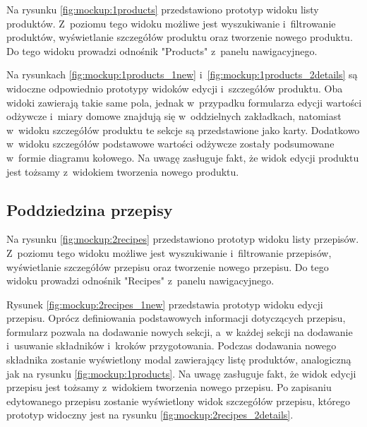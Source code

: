 Na rysunku \ref{fig:mockup:1products} przedstawiono prototyp widoku listy produktów.
Z~poziomu tego widoku możliwe jest wyszukiwanie i~filtrowanie produktów, wyświetlanie szczegółów produktu oraz tworzenie nowego produktu.
Do tego widoku prowadzi odnośnik "Products" z~panelu nawigacyjnego.


Na rysunkach \ref{fig:mockup:1products_1new} i~\ref{fig:mockup:1products_2details} są widoczne odpowiednio prototypy widoków edycji i~szczegółów produktu.
Oba widoki zawierają takie same pola, jednak w~przypadku formularza edycji wartości odżywcze i~miary domowe znajdują się w~oddzielnych zakładkach,
natomiast w~widoku szczegółów produktu te sekcje są przedstawione jako karty.
Dodatkowo w~widoku szczegółów podstawowe wartości odżywcze zostały podsumowane w~formie diagramu kołowego.
Na uwagę zasługuje fakt, że widok edycji produktu jest tożsamy z~widokiem tworzenia nowego produktu.



\subsection{Poddziedzina przepisy}

Na rysunku \ref{fig:mockup:2recipes} przedstawiono prototyp widoku listy przepisów.
Z~poziomu tego widoku możliwe jest wyszukiwanie i~filtrowanie przepisów, wyświetlanie szczegółów przepisu oraz tworzenie nowego przepisu.
Do tego widoku prowadzi odnośnik "Recipes" z~panelu nawigacyjnego.


Rysunek \ref{fig:mockup:2recipes_1new} przedstawia prototyp widoku edycji przepisu.
Oprócz definiowania podstawowych informacji dotyczących przepisu, formularz pozwala na dodawanie nowych sekcji, a~w każdej sekcji na dodawanie i~usuwanie składników i~kroków przygotowania.
Podczas dodawania nowego składnika zostanie wyświetlony modal zawierający listę produktów, analogiczną jak na rysunku \ref{fig:mockup:1products}.
Na uwagę zasługuje fakt, że widok edycji przepisu jest tożsamy z~widokiem tworzenia nowego przepisu.
Po zapisaniu edytowanego przepisu zostanie wyświetlony widok szczegółów przepisu, którego prototyp widoczny jest na rysunku \ref{fig:mockup:2recipes_2details}.

